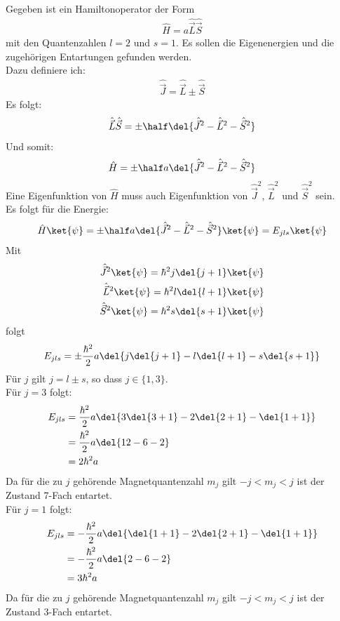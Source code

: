 \documentclass[11pt, ngerman, fleqn, DIV=15, headinclude]{scrartcl}
\begin{document}
Gegeben ist ein Hamiltonoperator der Form
\begin{align*}
	\hat{H}	= a\hat{\vec{L}}\hat{\vec{S}}
\end{align*}
mit den Quantenzahlen $l=2$ und $s=1$. Es sollen die Eigenenergien und die zugehörigen Entartungen gefunden werden.\\
Dazu definiere ich:
\begin{align*}
	\hat{\vec{J}} = \hat{\vec{L}} \pm \hat{\vec{S}}
\end{align*}
Es folgt:
\begin{align*}
	\hat{\vec{L}}\hat{\vec{S}} = \pm\half\del{\hat{\vec{J}}^2 - \hat{\vec{L}}^2 - \hat{\vec{S}}^2}
\end{align*}
Und somit:
\begin{align*}
	\hat{H}	= \pm\half a\del{\hat{\vec{J}}^2 - \hat{\vec{L}}^2 - \hat{\vec{S}}^2}
\end{align*}
Eine Eigenfunktion von $\hat{H}$ muss auch Eigenfunktion von $\hat{\vec{J}}^2$, $\hat{\vec{L}}^2$ und $\hat{\vec{S}}^2$ sein.\\
Es folgt für die Energie:
\begin{align*}
	\hat{H}\ket{\psi}	= \pm\half a\del{\hat{\vec{J}}^2 - \hat{\vec{L}}^2 - \hat{\vec{S}}^2}\ket{\psi} = E_{jls}\ket{\psi}
\end{align*}
Mit
\begin{align*}
	\hat{\vec{J}}^2\ket{\psi} = \hbar^2j\del{j + 1}\ket{\psi}\\
	\hat{\vec{L}}^2\ket{\psi} = \hbar^2l\del{l + 1}\ket{\psi}\\
	\hat{\vec{S}}^2\ket{\psi} = \hbar^2s\del{s + 1}\ket{\psi}\\
\end{align*}
folgt
\begin{align*}
	E_{jls} = \pm\frac{\hbar^2}{2}a\del{j\del{j + 1} - l\del{l + 1} - s\del{s + 1}}
\end{align*}
Für $j$ gilt $j = l \pm s$, so dass $j\in\{1,3\}$.\\
Für $j = 3$ folgt:
\begin{align*}
	E_{jls}	&= \frac{\hbar^2}{2}a\del{3\del{3 + 1} - 2\del{2 + 1} - \del{1 + 1}}\\
			&= \frac{\hbar^2}{2}a\del{12 - 6 - 2}\\
			&= 2\hbar^2a
\end{align*}
Da für die zu $j$ gehörende Magnetquantenzahl $m_j$ gilt $-j < m_j < j$ ist der Zustand 7-Fach entartet.\\
Für $j = 1$ folgt:
\begin{align*}
	E_{jls}	&= -\frac{\hbar^2}{2}a\del{\del{1 + 1} - 2\del{2 + 1} - \del{1 + 1}}\\
			&= -\frac{\hbar^2}{2}a\del{2 - 6 - 2}\\
			&= 3\hbar^2a
\end{align*}
Da für die zu $j$ gehörende Magnetquantenzahl $m_j$ gilt $-j < m_j < j$ ist der Zustand 3-Fach entartet.\\
\end{document}
